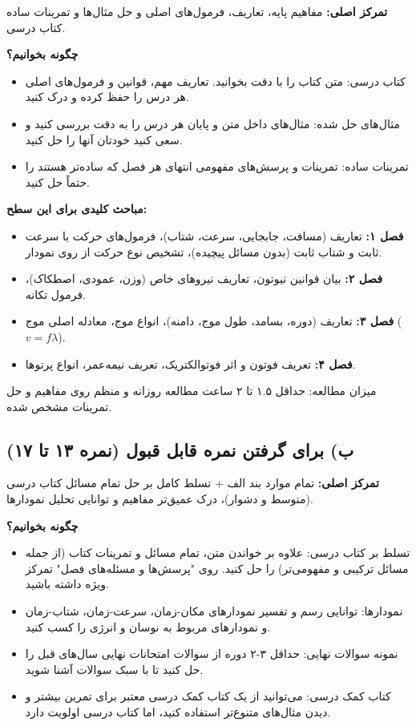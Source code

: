 \documentclass[12pt]{article}
\begin{document}
\textbf{تمرکز اصلی:} مفاهیم پایه، تعاریف، فرمول‌های اصلی و حل مثال‌ها و تمرینات ساده کتاب درسی.

\textbf{چگونه بخوانیم؟}
\begin{itemize}
    \item کتاب درسی: متن کتاب را با دقت بخوانید. تعاریف مهم، قوانین و فرمول‌های اصلی هر درس را حفظ کرده و درک کنید.
    \item مثال‌های حل شده: مثال‌های داخل متن و پایان هر درس را به دقت بررسی کنید و سعی کنید خودتان آنها را حل کنید.
    \item تمرینات ساده: تمرینات و پرسش‌های مفهومی انتهای هر فصل که ساده‌تر هستند را حتماً حل کنید.
\end{itemize}

\textbf{مباحث کلیدی برای این سطح:}
\begin{itemize}
    \item \textbf{فصل ۱:} تعاریف (مسافت، جابجایی، سرعت، شتاب)، فرمول‌های حرکت با سرعت ثابت و شتاب ثابت (بدون مسائل پیچیده)، تشخیص نوع حرکت از روی نمودار.
    \item \textbf{فصل ۲:} بیان قوانین نیوتون، تعاریف نیروهای خاص (وزن، عمودی، اصطکاک)، فرمول تکانه.
    \item \textbf{فصل ۳:} تعاریف (دوره، بسامد، طول موج، دامنه)، انواع موج، معادله اصلی موج ($v=f\lambda$).
    \item \textbf{فصل ۴:} تعریف فوتون و اثر فوتوالکتریک، تعریف نیمه‌عمر، انواع پرتوها.
\end{itemize}
میزان مطالعه: حداقل ۱.۵ تا ۲ ساعت مطالعه روزانه و منظم روی مفاهیم و حل تمرینات مشخص شده.

\subsection{ب) برای گرفتن نمره قابل قبول (نمره ۱۳ تا ۱۷)}

\textbf{تمرکز اصلی:} تمام موارد بند الف + تسلط کامل بر حل تمام مسائل کتاب درسی (متوسط و دشوار)، درک عمیق‌تر مفاهیم و توانایی تحلیل نمودارها.

\textbf{چگونه بخوانیم؟}
\begin{itemize}
    \item تسلط بر کتاب درسی: علاوه بر خواندن متن، تمام مسائل و تمرینات کتاب (از جمله مسائل ترکیبی و مفهومی‌تر) را حل کنید. روی "پرسش‌ها و مسئله‌های فصل" تمرکز ویژه داشته باشید.
    \item نمودارها: توانایی رسم و تفسیر نمودارهای مکان-زمان، سرعت-زمان، شتاب-زمان و نمودارهای مربوط به نوسان و انرژی را کسب کنید.
    \item نمونه سوالات نهایی: حداقل ۳-۲ دوره از سوالات امتحانات نهایی سال‌های قبل را حل کنید تا با سبک سوالات آشنا شوید.
    \item کتاب کمک درسی: می‌توانید از یک کتاب کمک درسی معتبر برای تمرین بیشتر و دیدن مثال‌های متنوع‌تر استفاده کنید، اما کتاب درسی اولویت دارد.
\end{itemize}
\end{document}
